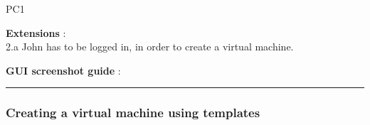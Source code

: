 \begin{lyxlist}{PC1}
{\item [\textbf{Extensions}]:\\
2.a John has to be logged in, in order to create a virtual machine.







\item [\textbf{GUI screenshot guide}]:\\

}

\end{lyxlist}
\hrule
\vspace{0.5cm}





\subsubsection{Creating a virtual machine using templates}

